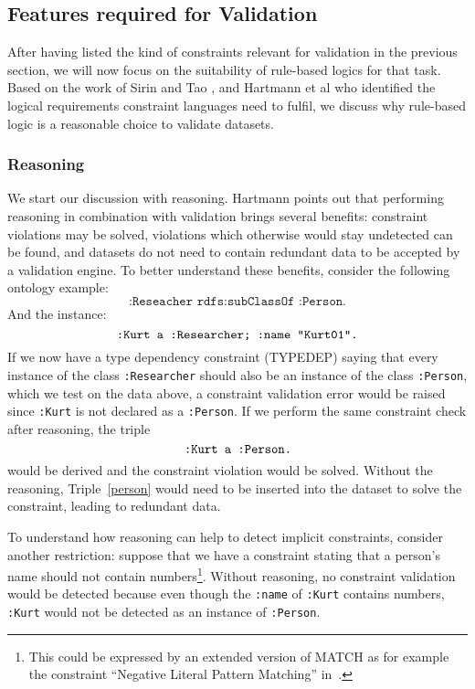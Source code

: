 \subsection{Features required for Validation}\label{logic}
After having listed the kind of constraints relevant for \rdf validation in the previous section, we will now focus on the suitability of rule-based logics for that task.
Based on the work of Sirin and Tao \cite{sirin2009towards}, and Hartmann et al \cite{bosch2015} who identified the logical requirements constraint 
languages need to fulfil,
we discuss why rule-based logic is a reasonable choice to validate \rdf datasets.




\subsubsection{Reasoning}\label{reasoning}
We start our discussion with reasoning. Hartmann \cite[p. 181]{hartmann2016} points out that performing reasoning in combination with \rdf validation brings several benefits:
constraint violations may be solved, violations which otherwise would stay undetected can be found, and datasets do not need to contain 
redundant data to be accepted by a validation engine. To better understand these benefits, consider the following ontology example:
\begin{equation}\label{subc}
 \texttt{:Reseacher rdfs:subClassOf :Person.}
\end{equation}
And the instance:
\begin{equation}\label{Kurt}
 \verb!:Kurt a :Researcher; :name "Kurt01".!
\end{equation}
If we now have a type dependency constraint (TYPEDEP) saying that every instance of the class \texttt{:Researcher} should also be an instance of the class \texttt{:Person}, 
which we test on the data above,
a constraint validation error would be raised since \texttt{:Kurt} is not declared as a \texttt{:Person}. If we perform the same constraint check after reasoning, the triple
\begin{equation}\label{person}
\verb!:Kurt a :Person.!
\end{equation}
would be derived and the constraint violation would be solved. Without the reasoning, Triple~\ref{person}
would need to be inserted into the dataset to solve the constraint,
leading to redundant data. 

To understand how reasoning 
can help to detect implicit constraints, consider another restriction: suppose that we have a constraint stating that a person's name should not contain 
numbers\footnote{This could be expressed by an extended version of MATCH as for example the constraint ``Negative Literal Pattern Matching'' in~\cite{hartmann2016}.}.
Without reasoning, no constraint validation would be detected because even though the \texttt{:name} of \texttt{:Kurt} contains numbers, \texttt{:Kurt} 
would not be detected as an instance of
\texttt{:Person}.


